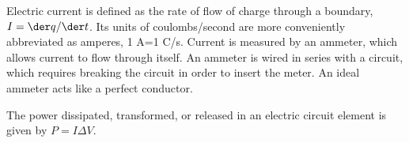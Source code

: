 Electric current is defined as the rate of flow of charge through a
boundary, $I=\der q/\der t$.  Its units of coulombs/second are more
conveniently abbreviated as amperes, 1 A=1 C/s. 
Current is measured by an ammeter, which allows current to flow through itself.
An ammeter is wired in series with a circuit, which requires breaking the circuit
in order to insert the meter.
An ideal ammeter acts like a perfect conductor.

The power dissipated, transformed, or released in an electric circuit element
is given by $P=I\Delta V$.
